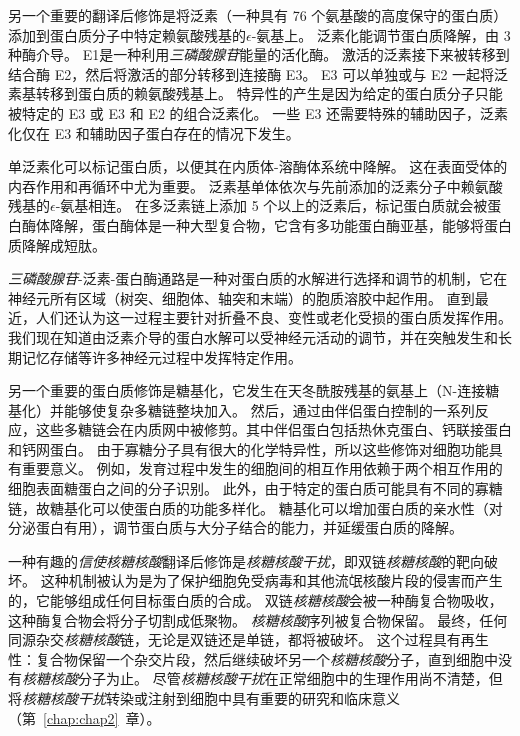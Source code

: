 另一个重要的翻译后修饰是将泛素（一种具有 76 个氨基酸的高度保守的蛋白质）添加到蛋白质分子中特定赖氨酸残基的$\epsilon$-氨基上。
泛素化能调节蛋白质降解，由 3 种酶介导。
E1是一种利用\textit{三磷酸腺苷}能量的活化酶。
激活的泛素接下来被转移到结合酶 E2，然后将激活的部分转移到连接酶 E3。
E3 可以单独或与 E2 一起将泛素基转移到蛋白质的赖氨酸残基上。
特异性的产生是因为给定的蛋白质分子只能被特定的 E3 或 E3 和 E2 的组合泛素化。
一些 E3 还需要特殊的辅助因子，泛素化仅在 E3 和辅助因子蛋白存在的情况下发生。


单泛素化可以标记蛋白质，以便其在内质体-溶酶体系统中降解。
这在表面受体的内吞作用和再循环中尤为重要。
泛素基单体依次与先前添加的泛素分子中赖氨酸残基的$\epsilon$-氨基相连。
在多泛素链上添加 5 个以上的泛素后，标记蛋白质就会被蛋白酶体降解，蛋白酶体是一种大型复合物，它含有多功能蛋白酶亚基，能够将蛋白质降解成短肽。


\textit{三磷酸腺苷}-泛素-蛋白酶通路是一种对蛋白质的水解进行选择和调节的机制，它在神经元所有区域（树突、细胞体、轴突和末端）的胞质溶胶中起作用。
直到最近，人们还认为这一过程主要针对折叠不良、变性或老化受损的蛋白质发挥作用。
我们现在知道由泛素介导的蛋白水解可以受神经元活动的调节，并在突触发生和长期记忆存储等许多神经元过程中发挥特定作用。


另一个重要的蛋白质修饰是糖基化，它发生在天冬酰胺残基的氨基上（N-连接糖基化）并能够使复杂多糖链整块加入。
然后，通过由伴侣蛋白控制的一系列反应，这些多糖链会在内质网中被修剪。其中伴侣蛋白包括热休克蛋白、钙联接蛋白和钙网蛋白。 
由于寡糖分子具有很大的化学特异性，所以这些修饰对细胞功能具有重要意义。
例如，发育过程中发生的细胞间的相互作用依赖于两个相互作用的细胞表面糖蛋白之间的分子识别。
此外，由于特定的蛋白质可能具有不同的寡糖链，故糖基化可以使蛋白质的功能多样化。
糖基化可以增加蛋白质的亲水性（对分泌蛋白有用），调节蛋白质与大分子结合的能力，并延缓蛋白质的降解。


一种有趣的\textit{信使核糖核酸}翻译后修饰是\textit{核糖核酸干扰}，即双链\textit{核糖核酸}的靶向破坏。
这种机制被认为是为了保护细胞免受病毒和其他流氓核酸片段的侵害而产生的，它能够组成任何目标蛋白质的合成。 
双链\textit{核糖核酸}会被一种酶复合物吸收，这种酶复合物会将分子切割成低聚物。
\textit{核糖核酸}序列被复合物保留。
最终，任何同源杂交\textit{核糖核酸}链，无论是双链还是单链，都将被破坏。
这个过程具有再生性：复合物保留一个杂交片段，然后继续破坏另一个\textit{核糖核酸}分子，直到细胞中没有\textit{核糖核酸}分子为止。
尽管\textit{核糖核酸干扰}在正常细胞中的生理作用尚不清楚，但将\textit{核糖核酸干扰}转染或注射到细胞中具有重要的研究和临床意义（第~\ref{chap:chap2}~章）。




